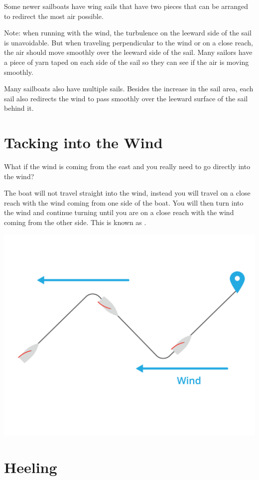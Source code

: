 Some newer sailboats have wing sails that have two pieces that can be arranged to redirect the most air possible.

Note: when running with the wind,  the turbulence on the leeward side of the sail is unavoidable.   But when traveling perpendicular to the wind or on a close reach,  the air should move smoothly over the leeward side of the sail.   Many sailors have a piece of yarn taped on each side of the sail so they can see if the air is moving smoothly.

Many sailboats also have multiple sails.  Besides the increase in the sail area,  each sail also redirects the wind to pass smoothly over the leeward surface of the sail
behind it.

\section{Tacking into the Wind}

What if the wind is coming from the east and you really need to go directly into the wind?  

The boat will not travel straight into the wind,  instead you will travel on a close reach with the wind coming from one side of the boat. You will then turn into the wind and continue turning
until you are on a close reach with the wind coming from the other side.  This is known as .

\begin{center}
    \includegraphics[width=.75\textwidth]{tacking.png}
    
\end{center}

\section{Heeling}


